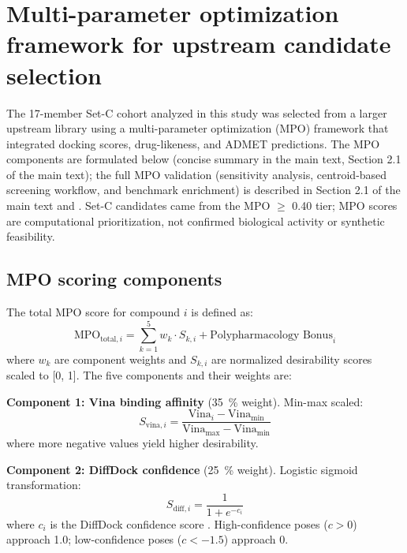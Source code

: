 \documentclass[11pt,a4paper]{article}
\begin{document}
	\section{Multi-parameter optimization framework for upstream candidate selection}\label{sec:sm_mpo}
	The 17-member Set-C cohort analyzed in this study was selected from a larger upstream library using a multi-parameter optimization (MPO) framework that integrated docking scores, drug-likeness, and ADMET predictions. The MPO components are formulated below (concise summary in the main text, Section 2.1 of the main text); the full MPO validation (sensitivity analysis, centroid-based screening workflow, and benchmark enrichment) is described in Section 2.1 of the main text and . Set-C candidates came from the MPO $\geq$ \num{0.40} tier; MPO scores are computational prioritization, not confirmed biological activity or synthetic feasibility.
	
	\subsection{MPO scoring components}\label{sec:sm_mpo_components}
	The total MPO score for compound $i$ is defined as:
	\begin{equation}
		\text{MPO}_{\text{total}, i} = \sum_{k=1}^{5} w_k \cdot S_{k,i} + \text{Polypharmacology Bonus}_i
		\label{eq:sm_mpo_total}
	\end{equation}
	where $w_k$ are component weights and $S_{k,i}$ are normalized desirability scores scaled to [\num{0}, \num{1}]. The five components and their weights are:
	
	\textbf{Component 1: Vina binding affinity} (\qty{35}{\percent} weight). Min-max scaled:
	\begin{equation}
		S_{\text{vina}, i} = \frac{\text{Vina}_i - \text{Vina}_{\min}}{\text{Vina}_{\max} - \text{Vina}_{\min}}
		\label{eq:sm_vina}
	\end{equation}
	where more negative values yield higher desirability.
	
	\textbf{Component 2: DiffDock confidence} (\qty{25}{\percent} weight). Logistic sigmoid transformation:
	\begin{equation}
		S_{\text{diff}, i} = \frac{1}{1 + e^{-c_i}}
		\label{eq:sm_diffdock}
	\end{equation}
	where $c_i$ is the DiffDock confidence score \cite{Corso2023}. High-confidence poses ($c > \num{0}$) approach \num{1.0}; low-confidence poses ($c < \num{-1.5}$) approach \num{0}.
	
\end{document}
